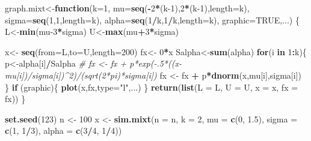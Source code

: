 \documentclass[
]{article}
\newenvironment{Shaded}{\begin{snugshade}}{\end{snugshade}}
\newcommand{\AttributeTok}[1]{\textcolor[rgb]{0.13,0.29,0.53}{#1}}
\newcommand{\CommentTok}[1]{\textcolor[rgb]{0.56,0.35,0.01}{\textit{#1}}}
\newcommand{\ConstantTok}[1]{\textcolor[rgb]{0.56,0.35,0.01}{#1}}
\newcommand{\ControlFlowTok}[1]{\textcolor[rgb]{0.13,0.29,0.53}{\textbf{#1}}}
\newcommand{\DecValTok}[1]{\textcolor[rgb]{0.00,0.00,0.81}{#1}}
\newcommand{\FloatTok}[1]{\textcolor[rgb]{0.00,0.00,0.81}{#1}}
\newcommand{\FunctionTok}[1]{\textcolor[rgb]{0.13,0.29,0.53}{\textbf{#1}}}
\newcommand{\NormalTok}[1]{#1}
\newcommand{\OtherTok}[1]{\textcolor[rgb]{0.56,0.35,0.01}{#1}}
\newcommand{\SpecialCharTok}[1]{\textcolor[rgb]{0.81,0.36,0.00}{\textbf{#1}}}
\newcommand{\StringTok}[1]{\textcolor[rgb]{0.31,0.60,0.02}{#1}}
\begin{document}
\begin{Shaded}
\begin{Highlighting}[]
\NormalTok{graph.mixt}\OtherTok{\textless{}{-}}\ControlFlowTok{function}\NormalTok{(}\AttributeTok{k=}\DecValTok{1}\NormalTok{, }\AttributeTok{mu=}\FunctionTok{seq}\NormalTok{(}\SpecialCharTok{{-}}\DecValTok{2}\SpecialCharTok{*}\NormalTok{(k}\DecValTok{{-}1}\NormalTok{),}\DecValTok{2}\SpecialCharTok{*}\NormalTok{(k}\DecValTok{{-}1}\NormalTok{),}\AttributeTok{length=}\NormalTok{k), }\AttributeTok{sigma=}\FunctionTok{seq}\NormalTok{(}\DecValTok{1}\NormalTok{,}\DecValTok{1}\NormalTok{,}\AttributeTok{length=}\NormalTok{k), }\AttributeTok{alpha=}\FunctionTok{seq}\NormalTok{(}\DecValTok{1}\SpecialCharTok{/}\NormalTok{k,}\DecValTok{1}\SpecialCharTok{/}\NormalTok{k,}\AttributeTok{length=}\NormalTok{k), }\AttributeTok{graphic=}\ConstantTok{TRUE}\NormalTok{,...)}
\NormalTok{\{}
\NormalTok{   L}\OtherTok{\textless{}{-}}\FunctionTok{min}\NormalTok{(mu}\DecValTok{{-}3}\SpecialCharTok{*}\NormalTok{sigma)}
\NormalTok{   U}\OtherTok{\textless{}{-}}\FunctionTok{max}\NormalTok{(mu}\SpecialCharTok{+}\DecValTok{3}\SpecialCharTok{*}\NormalTok{sigma)}
         
\NormalTok{   x}\OtherTok{\textless{}{-}} \FunctionTok{seq}\NormalTok{(}\AttributeTok{from=}\NormalTok{L,}\AttributeTok{to=}\NormalTok{U,}\AttributeTok{length=}\DecValTok{200}\NormalTok{)}
\NormalTok{   fx}\OtherTok{\textless{}{-}} \DecValTok{0}\SpecialCharTok{*}\NormalTok{x}
\NormalTok{   Salpha}\OtherTok{\textless{}{-}}\FunctionTok{sum}\NormalTok{(alpha)}
   \ControlFlowTok{for}\NormalTok{(i }\ControlFlowTok{in} \DecValTok{1}\SpecialCharTok{:}\NormalTok{k)\{}
\NormalTok{    p}\OtherTok{\textless{}{-}}\NormalTok{alpha[i]}\SpecialCharTok{/}\NormalTok{Salpha}
\CommentTok{\#       fx \textless{}{-} fx + p*exp({-}.5*((x{-}mu[i])/sigma[i])\^{}2)/(sqrt(2*pi)*sigma[i])}
\NormalTok{    fx }\OtherTok{\textless{}{-}}\NormalTok{ fx }\SpecialCharTok{+}\NormalTok{ p}\SpecialCharTok{*}\FunctionTok{dnorm}\NormalTok{(x,mu[i],sigma[i])}
\NormalTok{   \}}
   \ControlFlowTok{if}\NormalTok{ (graphic)\{}
      \FunctionTok{plot}\NormalTok{(x,fx,}\AttributeTok{type=}\StringTok{"l"}\NormalTok{,...)}
\NormalTok{   \}}
   \FunctionTok{return}\NormalTok{(}\FunctionTok{list}\NormalTok{(}\AttributeTok{L =}\NormalTok{ L, }\AttributeTok{U =}\NormalTok{ U, }\AttributeTok{x =}\NormalTok{ x, }\AttributeTok{fx =}\NormalTok{ fx))}
\NormalTok{\}}

\FunctionTok{set.seed}\NormalTok{(}\DecValTok{123}\NormalTok{)}
\NormalTok{n }\OtherTok{\textless{}{-}} \DecValTok{100}
\NormalTok{x }\OtherTok{\textless{}{-}} \FunctionTok{sim.mixt}\NormalTok{(}\AttributeTok{n =}\NormalTok{ n, }\AttributeTok{k =} \DecValTok{2}\NormalTok{, }\AttributeTok{mu =} \FunctionTok{c}\NormalTok{(}\DecValTok{0}\NormalTok{, }\FloatTok{1.5}\NormalTok{), }\AttributeTok{sigma =} \FunctionTok{c}\NormalTok{(}\DecValTok{1}\NormalTok{, }\DecValTok{1}\SpecialCharTok{/}\DecValTok{3}\NormalTok{), }\AttributeTok{alpha =} \FunctionTok{c}\NormalTok{(}\DecValTok{3}\SpecialCharTok{/}\DecValTok{4}\NormalTok{, }\DecValTok{1}\SpecialCharTok{/}\DecValTok{4}\NormalTok{))}


\end{Highlighting}
\end{Shaded}
\end{document}
